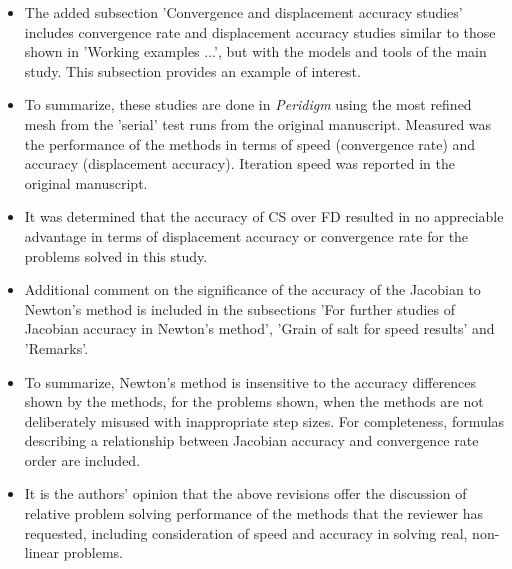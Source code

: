 \documentclass{article}
\begin{document}
\begin{enumerate}
{\color{red}
  \begin{itemize}
    \item 
      The added subsection 'Convergence and displacement accuracy studies'
      includes convergence rate and displacement accuracy studies similar to
      those shown in 'Working examples ...', but with the models and tools of
      the main study. This subsection provides an example of interest. 
  \item 
      To summarize, these studies are done in \emph{Peridigm} using the most refined mesh
      from the 'serial' test runs from the original manuscript. Measured was the performance of the methods in terms of speed
      (convergence rate) and accuracy (displacement accuracy).  Iteration speed
      was reported in the original manuscript.
  \item
      It was determined that the accuracy of CS over FD resulted in no appreciable
      advantage in terms of displacement accuracy or convergence rate for the problems
      solved in this study. 
    \item
      Additional comment on the significance of the accuracy of the Jacobian
      to Newton's method is included in the subsections 'For further studies of
      Jacobian accuracy in Newton's method', 'Grain of salt for speed results'
      and 'Remarks'. 
  \item 
      To summarize, Newton's method is insensitive to the accuracy differences
      shown by the methods, for the problems shown, when the methods are not
      deliberately misused with inappropriate step sizes. For completeness,
      formulas describing a relationship between Jacobian accuracy and
      convergence rate order are included. 
  \item
      It is the authors' opinion that the above revisions offer the discussion of relative problem solving
      performance of the methods that the reviewer has requested, including consideration
      of speed and accuracy in solving real, non-linear problems.
  \end{itemize}}

  \end{enumerate}
\end{document}
